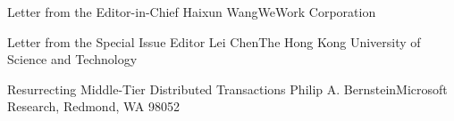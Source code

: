 \documentclass[11pt]{article}
\begin{document}


\begin{bulletin}


%
%

\begin{lettersection}


\begin{letter}{Letter from the Editor-in-Chief}
{Haixun Wang}{WeWork Corporation}

\end{letter}
%
\newpage
%
%
\begin{letter}{Letter from the Special Issue Editor}
{Lei Chen}{The Hong Kong University of Science and Technology}


\end{letter}

\end{lettersection}


\begin{opinionsection}
\begin{opinion}{Resurrecting Middle-Tier Distributed Transactions}
{Philip A. Bernstein}{Microsoft Research, Redmond, WA 98052}

\end{opinion}
\end{opinionsection}


\end{bulletin}
\end{document}
